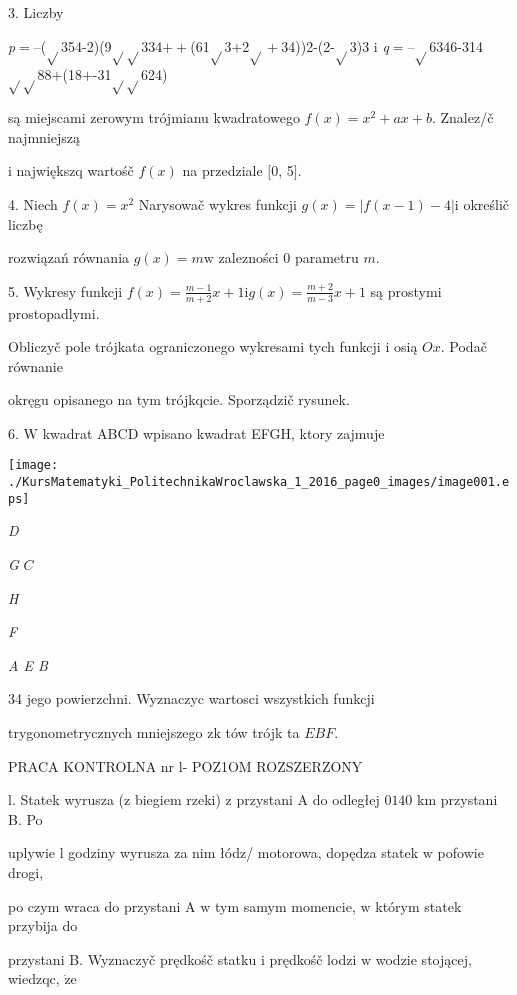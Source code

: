 \documentclass[a4paper,12pt]{article}
\begin{document}
3. Liczby

{\it p}$=$--($\sqrt{}$354-2)(9$\sqrt{}\sqrt{}$334$++$(61$\sqrt{}$3$+$2$\sqrt{}+$34))2-(2-$\sqrt{}$3)3 i {\it q}$=$--$\sqrt{}$6346-314$\sqrt{}\sqrt{}$88$+$(18$+$-31$\sqrt{}\sqrt{}$624)

są miejscami zerowym trójmianu kwadratowego $f(x)=x^{2}+ax+b$. Znalez/č najmniejszą

$\mathrm{i}$ największq wartośč $f(x)$ na przedziale $[0$, 5$].$

4. Niech $f(x) = x^{2}$ Narysowač wykres funkcji $g(x) = |f(x-1) -4| \mathrm{i}$ określič liczbę

rozwiązań równania $g(x)=m\mathrm{w}$ zalezności $0$ parametru $m.$

5. Wykresy funkcji $f(x) = \displaystyle \frac{m-1}{m+2}x+1\mathrm{i}g(x) =\displaystyle \frac{m+2}{m-3}x+1$ są prostymi prostopadlymi.

Obliczyč pole trójkata ograniczonego wykresami tych funkcji $\mathrm{i}$ osią $Ox$. Podač równanie

okręgu opisanego na tym trójkqcie. Sporządzič rysunek.

6. $\mathrm{W}$ kwadrat ABCD wpisano kwadrat EFGH, ktory zajmuje
\begin{center}
\texttt{[image: ./KursMatematyki\_PolitechnikaWroclawska\_1\_2016\_page0\_images/image001.eps]}
\end{center}
{\it D}

{\it G} $C$

{\it H}

{\it F}

{\it A E  B}

34 jego powierzchni. Wyznaczyc wartosci wszystkich funkcji

trygonometrycznych mniejszego $\mathrm{z}\mathrm{k}$ tów trójk ta $EBF.$




PRACA KONTROLNA nr l- POZ1OM ROZSZERZONY

l. Statek wyrusza ($\mathrm{z}$ biegiem rzeki) $\mathrm{z}$ przystani A do odległej $0 140$ km przystani B. Po

uplywie l godziny wyrusza za nim łódz/ motorowa, dopędza statek $\mathrm{w}$ pofowie drogi,

po czym wraca do przystani A $\mathrm{w}$ tym samym momencie, $\mathrm{w}$ którym statek przybija do

przystani B. Wyznaczyč prędkośč statku $\mathrm{i}$ prędkośč lodzi $\mathrm{w}$ wodzie stojącej, wiedzqc, $\dot{\mathrm{z}}\mathrm{e}$
\end{document}
